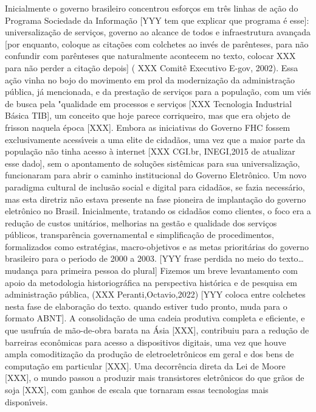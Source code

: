 \documentclass[
12pt,		%
openright,	%
twoside,  %
a4paper,			%
chapter=TITLE,		%
english,			%
french,				%
spanish,			%
brazil				%
]{USPSC-classe/USPSC}
\begin{document}
Inicialmente o governo brasileiro concentrou esfor\c{c}os em tr\^es linhas de a\c{c}\~ao do Programa Sociedade da Informa\c{c}\~ao [YYY tem que explicar que programa \'e esse]: universaliza\c{c}\~ao de servi\c{c}os, governo ao alcance de todos e infraestrutura avan\c{c}ada [por enquanto, coloque as cita\c{c}\~oes com colchetes ao inv\'es de par\^enteses, para n\~ao confundir com par\^enteses que naturalmente acontecem no texto, colocar XXX para n\~ao perder a cita\c{c}\~ao depois] ( XXX Comit\^e Executivo E-gov, 2002).
Essa a\c{c}\~ao vinha no bojo do movimento em prol da moderniza\c{c}\~ao da administra\c{c}\~ao p\'ublica, j\'a mencionada, e da presta\c{c}\~ao de servi\c{c}os para a popula\c{c}\~ao, com um vi\'es de busca pela "qualidade em processos e servi\c{c}os [XXX Tecnologia Industrial B\'asica TIB], um conceito que hoje parece corriqueiro, mas que era objeto de frisson naquela \'epoca [XXX].
Embora as iniciativas do Governo FHC fossem exclusivamente acess\'{\i}veis a uma elite de cidad\~aos, uma vez que a maior parte da popula\c{c}\~ao n\~ao tinha acesso \`a internet [XXX CGI.br, INEGI,2015 de atualizar esse dado], sem o apontamento de solu\c{c}\~oes sist\^emicas para sua universaliza\c{c}\~ao, funcionaram para abrir o caminho institucional do Governo Eletr\^onico.
Um novo paradigma cultural de inclus\~ao social e digital para cidad\~aos, se fazia necess\'ario, mas esta diretriz n\~ao estava presente na fase pioneira de implanta\c{c}\~ao do governo eletr\^onico no Brasil. Inicialmente, tratando os cidad\~aos como clientes, o foco era a redu\c{c}\~ao de custos unit\'arios, melhorias na gest\~ao e qualidade dos servi\c{c}os p\'ublicos, transpar\^encia governamental e simplifica\c{c}\~ao de procedimentos, formalizados como estrat\'egias, macro-objetivos e  as metas priorit\'arias  do governo brasileiro para o per\'{\i}odo de 2000 a 2003.
[YYY frase perdida no meio do texto… mudan\c{c}a para primeira pessoa do plural] Fizemos um breve levantamento com apoio da metodologia historiogr\'afica na  perspectiva hist\'orica e de pesquisa em administra\c{c}\~ao p\'ublica, (XXX Peranti,Octavio,2022) [YYY coloca entre colchetes nesta fase de elabora\c{c}\~ao do texto. quando estiver tudo pronto, muda para o formato ABNT].
A consolida\c{c}\~ao de uma cadeia produtiva completa e eficiente, e que usufru\'{\i}a de m\~ao-de-obra barata na \'Asia [XXX], contribuiu para a redu\c{c}\~ao de barreiras econ\^omicas para acesso a dispositivos digitais, uma vez que houve ampla comoditiza\c{c}\~ao da produ\c{c}\~ao de eletroeletr\^onicos em geral e dos bens de computa\c{c}\~ao em particular [XXX]. Uma decorr\^encia direta da Lei de Moore [XXX], o mundo passou a produzir mais transistores eletr\^onicos do que gr\~aos de soja [XXX], com ganhos de escala que tornaram essas tecnologias mais dispon\'{\i}veis.
\end{document}
